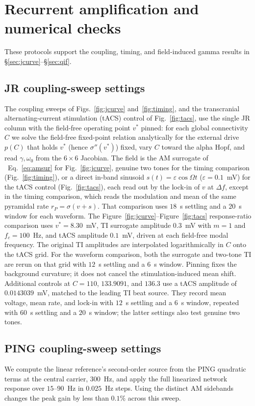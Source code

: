 \documentclass[11pt,a4paper]{article}
\newif\ifjne
\newif\ifsupp
\newcommand{\Sig}{\sigma}
\begin{document}
\section{Recurrent amplification and numerical checks}\label{supp:amplification}
These protocols support the coupling, timing, and field-induced gamma results in
\S\ref{sec:jcurve}--\S\ref{sec:qif}.
\subsection{JR coupling-sweep settings}\label{app:jr-sweep-settings}
The coupling sweeps of Figs.~\ref{fig:jcurve} and~\ref{fig:timing}, and the transcranial
alternating-current stimulation (tACS) control of Fig.~\ref{fig:tacs}, use the single JR
column with the field-free operating point $v^*$ pinned: for
each global connectivity $C$ we solve the field-free fixed-point relation analytically
for the external drive $p(C)$ that holds $v^*$ (hence $\Sig''(v^*)$) fixed, vary $C$
toward the alpha Hopf, and read $\gamma,\omega_0$ from the $6\times6$ Jacobian. The field
is the AM surrogate of \ifsupp main-text\fi\ Eq.~\eqref{eq:amsur} for Fig.~\ref{fig:jcurve}, genuine two
tones for the timing comparison (Fig.~\ref{fig:timing}), or a direct in-band sinusoid $s(t)=\varepsilon\cos\Omega t$
($\varepsilon=0.1$~mV) for the tACS control (Fig.~\ref{fig:tacs}), each read out by the
lock-in of $v$ at $\Delta f$, except in the timing comparison, which reads the
modulation and mean of the same pyramidal rate $r_P=\Sig(v+s)$.
That comparison uses $18$~s settling and a $20$~s window for each waveform.
The Figure~\ref{fig:jcurve}--Figure~\ref{fig:tacs} response-ratio comparison uses
$v^*=8.30$~mV, TI surrogate amplitude $0.3$~mV with $m=1$ and $f_c=100$~Hz,
and tACS amplitude $0.1$~mV, driven at each field-free modal frequency.
The original TI amplitudes are interpolated logarithmically in $C$ onto the tACS
grid. For the waveform comparison, both the surrogate and two-tone TI are rerun
on that grid with $12$~s settling and a $6$~s window.
Pinning fixes the background curvature; it does not cancel the stimulation-induced
mean shift.
Additional controls at $C=110$, $133.9091$, and $136.3$ use a tACS amplitude of
$0.0143039$~mV, matched to the leading TI beat source. They record mean voltage,
mean rate, and lock-in with $12$~s settling and a $6$~s window, repeated with
$60$~s settling and a $20$~s window; the latter settings also test genuine two tones.


\ifjne
\subsection{PING coupling-sweep settings}\label{supp:ping-runs}
We compute the linear reference's
second-order source from the PING quadratic terms at the central carrier,
$300$~Hz, and apply the full linearized network response over $15$--$90$~Hz
in $0.025$~Hz steps. Using the distinct AM sidebands changes the peak gain by
less than $0.1\%$ across this sweep.
\end{document}
